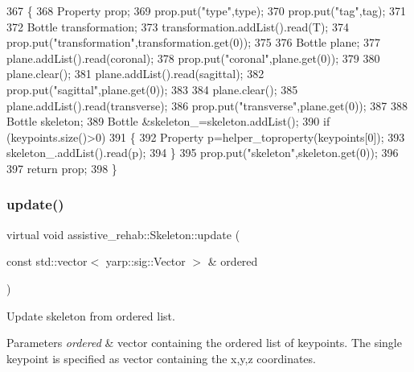 \begin{DoxyCode}
367 \{
368     Property prop;
369     prop.put(\textcolor{stringliteral}{"type"},type);
370     prop.put(\textcolor{stringliteral}{"tag"},tag);
371 
372     Bottle transformation;
373     transformation.addList().read(T);
374     prop.put(\textcolor{stringliteral}{"transformation"},transformation.get(0));
375 
376     Bottle plane;
377     plane.addList().read(coronal);
378     prop.put(\textcolor{stringliteral}{"coronal"},plane.get(0));
379 
380     plane.clear();
381     plane.addList().read(sagittal);
382     prop.put(\textcolor{stringliteral}{"sagittal"},plane.get(0));
383 
384     plane.clear();
385     plane.addList().read(transverse);
386     prop.put(\textcolor{stringliteral}{"transverse"},plane.get(0));
387 
388     Bottle skeleton;
389     Bottle &skeleton\_=skeleton.addList();
390     \textcolor{keywordflow}{if} (keypoints.size()>0)
391     \{
392         Property p=helper\_toproperty(keypoints[0]);
393         skeleton\_.addList().read(p);
394     \}
395     prop.put(\textcolor{stringliteral}{"skeleton"},skeleton.get(0));
396 
397     \textcolor{keywordflow}{return} prop;
398 \}
\end{DoxyCode}
\mbox{\label{classassistive__rehab_1_1Skeleton_adbb387558eac21173b7c82cb43acd603}} 
\subsubsection{\texorpdfstring{update()}{update()}\hspace{0.1cm}{\footnotesize\ttfamily [1/3]}}
{\footnotesize\ttfamily virtual void assistive\+\_\+rehab\+::\+Skeleton\+::update (\begin{DoxyParamCaption}\item[{const std\+::vector$<$ yarp\+::sig\+::\+Vector $>$ \&}]{ordered }\end{DoxyParamCaption})\hspace{0.3cm}{\ttfamily [virtual]}}



Update skeleton from ordered list. 


\begin{DoxyParams}{Parameters}
{\em ordered} & vector containing the ordered list of keypoints. The single keypoint is specified as vector containing the x,y,z coordinates. \\
\hline
\end{DoxyParams}
\mbox{\label{classassistive__rehab_1_1Skeleton_ab9642d6621d0a2b189c020f4d7695b14}} 
